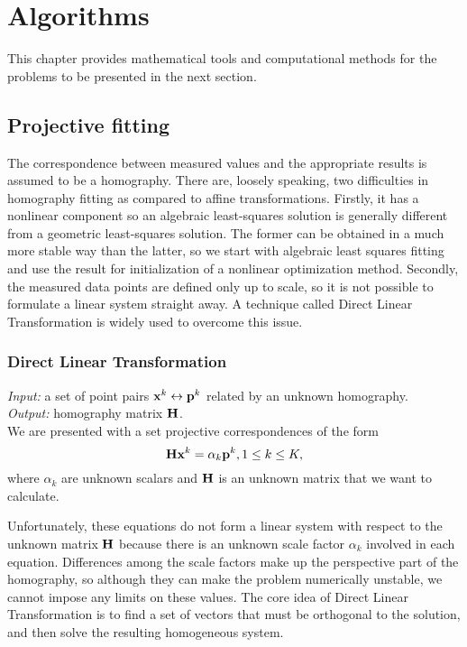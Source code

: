 \chapter{Algorithms}

This chapter provides mathematical tools and computational methods for the problems to be presented in the next section.

\section{Projective fitting}
The correspondence between measured values and the appropriate results is assumed to be a homography.
There are, loosely speaking, two difficulties in homography fitting as compared to affine transformations.
Firstly, it has a nonlinear component so an algebraic least-squares solution is generally different from a geometric least-squares solution.
The former can be obtained in a much more stable way than the latter, so we start with algebraic least squares fitting and use the result for initialization of a nonlinear optimization method.
Secondly, the measured data points are defined only up to scale, so it is not possible to formulate a linear system straight away.
A technique called Direct Linear Transformation is widely used to overcome this issue.

\subsection{Direct Linear Transformation}

\textit{Input:} a set of point pairs $\mathbf{x}^k \leftrightarrow \mathbf{p}^k$ related by an unknown homography.\\
\textit{Output:} homography matrix $\mathbf{H}$.\\

We are presented with a set projective correspondences of the form
$$\mathbf{H} \mathbf{x}^k = \alpha_k \mathbf{p}^k, 1 \leq k \leq K,$$
where $\alpha_k$ are unknown scalars and $\mathbf{H}$ is an unknown matrix that we want to calculate.

Unfortunately, these equations do not form a linear system with respect to the unknown matrix $\mathbf{H}$ because there is an unknown scale factor $\alpha_k$ involved in each equation.
Differences among the scale factors make up the perspective part of the homography, so although they can make the problem numerically unstable, we cannot impose any limits on these values.
The core idea of Direct Linear Transformation is to find a set of vectors that must be orthogonal to the solution, and then solve the resulting homogeneous system.

